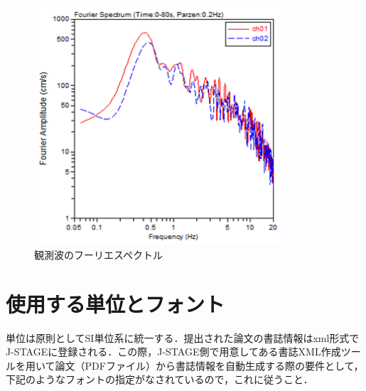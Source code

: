 \documentclass{jaee}
\begin{document}
\begin{figure}
  \centering
  \includegraphics[height=89mm]{fig1}
  \caption{観測波のフーリエスペクトル}
  \label{fig:1}
\end{figure}

\section{使用する単位とフォント}
\label{sec:8}

単位は原則としてSI単位系に統一する．提出された論文の書誌情報はxml形式でJ-STAGEに登録される．この際，J-STAGE側で用意してある書誌XML作成ツールを用いて論文（PDFファイル）から書誌情報を自動生成する際の要件として，下記のようなフォントの指定がなされているので，これに従うこと．

\newpage
\end{document}
